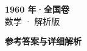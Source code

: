 \documentclass[zihao=-4, a4paper]{ctexart}
\begin{document}
\begin{center}
  {\Large\bfseries 1960 年·全国卷}\\[4pt]
  {\large 数学 · 解析版}
\end{center}
\medskip
{}

\clearpage
{}
\begin{center}{\Large\bfseries 参考答案与详细解析}\end{center}
\medskip

\end{document}
